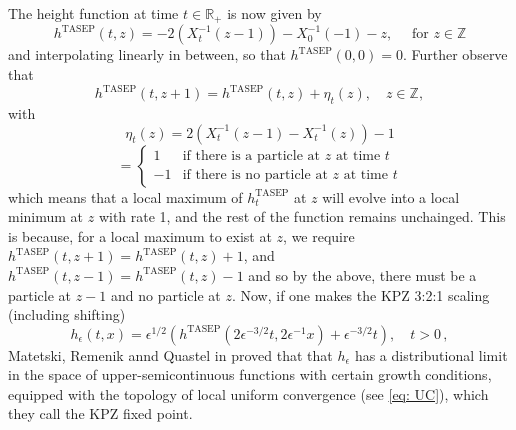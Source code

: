 \documentclass[12pt]{report}
\theoremstyle{plain}
\newcommand{\R}{\ensuremath{\mathbb{R}}}
\newcommand{\Z}{\ensuremath{\mathbb{Z}}}
\begin{document}
\noindent The height function at time \(t\in\R_{+}\) is now given by
\[
h^{\text{TASEP}}(t,z) = -2(X^{-1}_t(z-1))-X^{-1}_0(-1)-z, \quad \text{ for } z\in\Z
\]
and interpolating linearly in between, so that \(h^{\text{TASEP}}(0,0) = 0\). Further observe that 
\[
h^{\text{TASEP}}(t, z+1) = h^{\text{TASEP}}(t, z) + \eta_t(z), \quad z\in \Z,
\]
with 
\[
\eta_t(z) = 2(X^{-1}_t(z-1)-X^{-1}_t(z)) -1\]
\[
= \begin{cases}
    1 & \text{if there is a particle at } z \text{ at time } t\\
    -1 & \text{if there is no particle at } z \text{ at time } t
\end{cases}
\]
which means that a local maximum of \(h^{\text{TASEP}}_t\) at \(z\) will evolve into a local minimum at \(z\) with rate 1, and the rest of the function remains unchainged. This is because, for a local maximum to exist at \(z\), we require \(h^{\text{TASEP}}(t, z+1) = h^{\text{TASEP}}(t, z)+1\), and \(h^{\text{TASEP}}(t, z-1) = h^{\text{TASEP}}(t, z)-1\) and so by the above, there must be a particle at \(z-1\) and no particle at \(z\). Now, if one makes the KPZ 3:2:1 scaling (including shifting)
\begin{equation}\label{eq: KPZ scaling}
h_{\epsilon}(t,x) = \epsilon^{1/2}(h^{\text{TASEP}}(2\epsilon^{-3/2}t, 2\epsilon^{-1}x) + \epsilon^{-3/2}t), \quad t>0\,,
\end{equation}
Matetski, Remenik annd Quastel in \cite{matetski2021kpz} proved that that \(h_{\epsilon}\) has a distributional limit in the space of upper-semicontinuous functions with certain growth conditions, equipped with the topology of local uniform convergence (see \ref{eq: UC}), which they call the KPZ fixed point.\\
\end{document}
